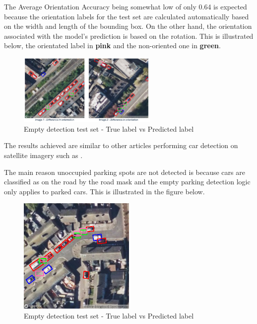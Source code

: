 The Average Orientation Accuracy being somewhat low of only 0.64 is expected
because the orientation labels for the test set are calculated automatically
based on the width and length of the bounding box. On the other hand, the
orientation associated with the model’s prediction is based on the rotation.
This is illustrated below, the orientated label in \textbf{pink} and the
non-oriented one in \textbf{green}.

\begin{figure}[htbp]
  \centering
  \includegraphics[width=0.6\textwidth]{images/empty-detection-orientation.png}
  \caption{Empty detection test set - True label vs Predicted label}
\end{figure}

\newpage{}

The results achieved are similar to other articles performing car detection on
satellite imagery such as \cite{similarresults}.

The main reason unoccupied parking spots are not detected is because cars are
classified as on the road by the road mask and the empty parking detection logic
only applies to parked cars. This is illustrated in the figure below.
\begin{figure}[htbp]
  \centering
  \includegraphics[width=0.5\textwidth]{images/empty-detection-orientation2.png}
  \caption{Empty detection test set - True label vs Predicted label}
\end{figure}

